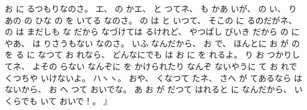 お
に
るつもりなのさ。
%
エ、
%
の
かエ、
%
%
と
つてネ、
%
も
かあ
いが、
%
の
い、
%
り
あの
の
ひな
の
を
いてる
なのさ。
%
の
は
と
いつて、
%
そこの
に
るのだがネ、
%
の
は
まだしも
な
だから
なづけては
るけれど、
%
やつぱし
びいき
だから
の
にやあ、
%
は
りさうもない
なのさ。
%
いふ
なんだから、
%
お
で、
%
ほんとに
お
が
の
を
る
に
なつて
お
れなら、
%
どんなにでも
は
お
に
を
れるよ。
%
%
り
お
つかりしてネ、
%
よその
らない
なんぞに
を
かけられたり
なんぞ
ないやうに
て
お
れで
くつちや
いけないよ。
%
ハヽヽ。
%
おや、
%
くなつて
たネ、
%
さへ
が
てあるなら
はないから、
%
お
へ
つて
おいでな。
%
あ
お
が
だつて
はれると
に
なんだから、
%
いくらでも
いて
おいで！。
』
